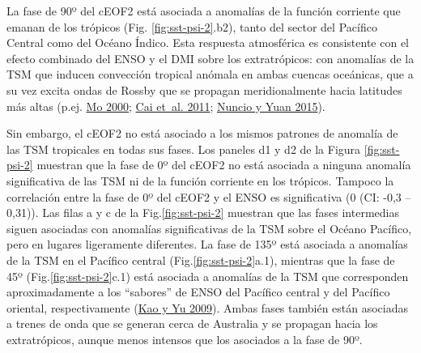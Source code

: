 \documentclass[12pt,oneside,a4paper]{reedthesis}
\begin{document}
La fase de 90º del cEOF2 está asociada a anomalías de la función corriente que emanan de los trópicos (Fig. \ref{fig:sst-psi-2}.b2), tanto del sector del Pacífico Central como del Océano Índico.
Esta respuesta atmosférica es consistente con el efecto combinado del ENSO y el DMI sobre los extratrópicos: con anomalías de la TSM que inducen convección tropical anómala en ambas cuencas oceánicas, que a su vez excita ondas de Rossby que se propagan meridionalmente hacia latitudes más altas (p.ej. \protect\hyperlink{ref-mo2000}{Mo 2000}; \protect\hyperlink{ref-cai2011}{Cai et~al. 2011}; \protect\hyperlink{ref-nuncio2015}{Nuncio y Yuan 2015}).

Sin embargo, el cEOF2 no está asociado a los mismos patrones de anomalía de las TSM tropicales en todas sus fases.
Los paneles d1 y d2 de la Figura \ref{fig:sst-psi-2} muestran que la fase de 0º del cEOF2 no está asociada a ninguna anomalía significativa de las TSM ni de la función corriente en los trópicos.
Tampoco la correlación entre la fase de 0º del cEOF2 y el ENSO es significativa (0 (CI: -0,3 -- 0,31)).
Las filas a y c de la Fig.\ref{fig:sst-psi-2} muestran que las fases intermedias siguen asociadas con anomalías significativas de la TSM sobre el Océano Pacífico, pero en lugares ligeramente diferentes.
La fase de 135º está asociada a anomalías de la TSM en el Pacífico central (Fig.\ref{fig:sst-psi-2}a.1), mientras que la fase de 45º (Fig.\ref{fig:sst-psi-2}c.1) está asociada a anomalías de la TSM que corresponden aproximadamente a los ``sabores'' de ENSO del Pacífico central y del Pacífico oriental, respectivamente (\protect\hyperlink{ref-kao2009}{Kao y Yu 2009}).
Ambas fases también están asociadas a trenes de onda que se generan cerca de Australia y se propagan hacia los extratrópicos, aunque menos intensos que los asociados a la fase de 90º.
\end{document}
